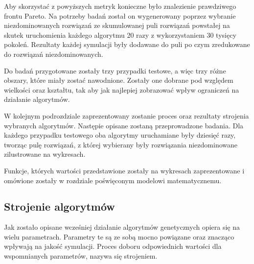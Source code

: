 \documentclass[twoside]{iisthesis}
\begin{document}
Aby skorzystać z powyższych metryk konieczne było znalezienie prawdziwego frontu Pareto. Na potrzeby badań został on wygenerowany poprzez wybranie niezdominowanych rozwiązań ze skumulowanej puli rozwiązań powstałej na skutek uruchomienia każdego algorytmu 20 razy z wykorzystaniem 30 tysięcy pokoleń. Rezultaty każdej symulacji były dodawane do puli po czym zredukowane do rozwiązań niezdominowanych.

Do badań przygotowane zostały trzy przypadki testowe, a więc trzy różne obszary, które miały zostać nawodnione. Zostały one dobrane pod względem wielkości oraz kształtu, tak aby jak najlepiej zobrazować wpływ ograniczeń na działanie algorytmów.

W kolejnym podrozdziale zaprezentowany zostanie proces oraz rezultaty strojenia wybranych algorytmów. Następie opisane zostaną przeprowadzone badania. Dla każdego przypadku testowego oba algorytmy uruchamiane były dziesięć razy, tworząc pulę rozwiązań, z której wybierany były rozwiązania niezdominowane zilustrowane na wykresach.

Funkcje, których wartości przedstawione zostały na wykresach zaprezentowane i omówione zostały w rozdziale poświęconym modelowi matematycznemu.
\subsection{Strojenie algorytmów}
Jak zostało opisane wcześniej działanie algorytmów genetycznych opiera się na wielu parametrach. Parametry te są ze sobą mocno powiązane oraz znacząco wpływają na jakość symulacji. Proces doboru odpowiednich wartości dla wspomnianych parametrów, nazywa się strojeniem.
\end{document}
